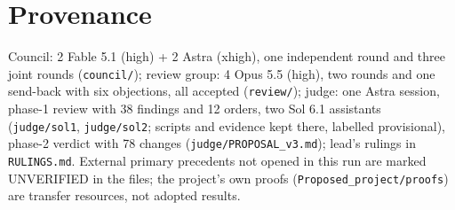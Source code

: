 \documentclass[11pt,a4paper]{article}
\theoremstyle{plain}
\theoremstyle{definition}
\theoremstyle{remark}
\begin{document}
\section{Provenance}
Council: 2 Fable 5.1 (high) + 2 Astra (xhigh), one independent round and three joint rounds (\texttt{council/}); review group: 4 Opus 5.5 (high), two rounds and one send-back with six objections, all accepted (\texttt{review/}); judge: one Astra session, phase-1 review with 38 findings and 12 orders, two Sol 6.1 assistants (\texttt{judge/sol1}, \texttt{judge/sol2}; scripts and evidence kept there, labelled provisional), phase-2 verdict with 78 changes (\texttt{judge/PROPOSAL\_v3.md}); lead's rulings in \texttt{RULINGS.md}. External primary precedents not opened in this run are marked UNVERIFIED in the files; the project's own proofs (\texttt{Proposed\_project/proofs}) are transfer resources, not adopted results.
\end{document}
